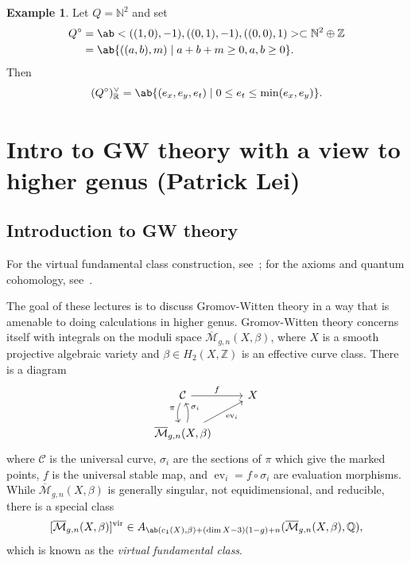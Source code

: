 \documentclass{amsart}
\theoremstyle{definition}
\newtheorem{exm}[thm]{Example}
\theoremstyle{remark}
\theoremstyle{plain}
\theoremstyle{definition}
\theoremstyle{remark}
\newcommand{\N}{\mathbb{N}}
\newcommand{\R}{\mathbb{R}}
\newcommand{\Z}{\mathbb{Z}}
\newcommand{\Q}{\mathbb{Q}}
\newcommand{\Mbar}{\overline{\mathcal{M}}}
\newcommand{\mc}[1]{\mathcal{#1}}
\newcommand{\mr}[1]{\mathrm{#1}}
\newcommand{\on}[1]{\operatorname{#1}}
\newcommand{\1}{\mathbf{1}}
\newcommand{\2}{\mathbf{2}}
\newcommand{\3}{\mathbf{3}}
\newcommand{\vir}{\mr{vir}}
\DeclareMathOperator{\ev}{ev}
\begin{document}
\begin{exm}
    Let \(Q = \N^2\) and set 
    \begin{align*}
        Q^{\circ} &= \ab<((1,0), -1), ((0,1), -1), ((0,0),1)> \subset \N^2 \oplus \Z \\
        &= \ab\{((a,b), m) \mid a+b+m \geq 0, a,b \geq 0 \}.
    \end{align*}
    Then
    \[ (Q^{\circ})_{\R}^{\vee} = \ab\{ (e_x, e_y, e_t) \mid 0 \leq e_t \leq \min(e_x, e_y) \}. \]
\end{exm}





\section{Intro to GW theory with a view to higher genus (Patrick Lei)}%
\label{sec:Intro to GW theory with a view to higher genus (Patrick Lei)}


\subsection{Introduction to GW theory}%
\label{sub:Introduction to GW theory}

For the virtual fundamental class construction, see~\cite{BehrendFantechi1997}; for the axioms and quantum cohomology, see~\cite{KM1994}.

The goal of these lectures is to discuss Gromov-Witten theory in a way that is amenable to doing calculations in higher genus. Gromov-Witten theory concerns itself with integrals on the moduli space \(\Mbar_{g,n}(X, \beta)\), where \(X\) is a smooth projective algebraic variety and \(\beta \in H_2(X, \Z)\) is an effective curve class. There is a diagram
\begin{equation*}
\begin{tikzcd}
    \mc{C} \ar{r}{f} \ar[bend right=20]{d}[swap]{\pi} & X \\
    \Mbar_{g,n}(X, \beta) \ar[bend right=20]{u}[swap]{\sigma_i} \ar{ur}[swap]{\on{ev}_i}
\end{tikzcd}
\end{equation*}
where \(\mc{C}\) is the universal curve, \(\sigma_i\) are the sections of \(\pi\) which give the marked points, \(f\) is the universal stable map, and \(\ev_i = f \circ \sigma_i\) are evaluation morphisms. While \(\Mbar_{g,n}(X, \beta)\) is generally singular, not equidimensional, and reducible, there is a special class
\[ [\Mbar_{g,n}(X, \beta)]^{\vir} \in A_{\ab(c_1(X), \beta) + (\dim X - 3)(1-g) + n}(\Mbar_{g,n}(X, \beta), \Q), \]
which is known as the \textit{virtual fundamental class}. 
\end{document}
